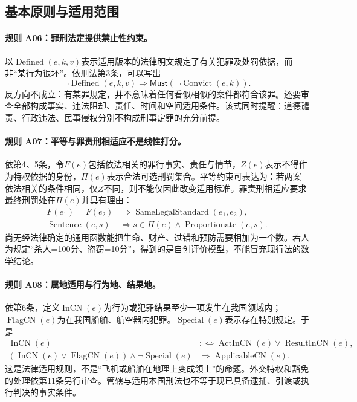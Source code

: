\subsection{基本原则与适用范围}
\paragraph{规则 A06：罪刑法定提供禁止性约束。}
以$\operatorname{Defined}(e,k,v)$表示适用版本的法律明文规定了有关犯罪及处罚依据，而非“某行为很坏”。依刑法第3条，可以写出
\[
\neg\operatorname{Defined}(e,k,v)
\Longrightarrow\mathsf{Must}(\neg\operatorname{Convict}(e,k)).
\]
反方向不成立：有某罪规定，并不意味着任何看似相似的案件都符合该罪。还要审查全部构成事实、违法阻却、责任、时间和空间适用条件。该式同时提醒：道德谴责、行政违法、民事侵权分别不构成刑事定罪的充分前提。

\paragraph{规则 A07：平等与罪责刑相适应不是线性打分。}
依第4、5条，令$F(e)$包括依法相关的罪行事实、责任与情节，$Z(e)$表示不得作为特权依据的身份，$\Pi(e)$表示合法可选刑罚集合。平等约束可表达为：若两案依法相关的条件相同，仅$Z$不同，则不能仅因此改变适用标准。罪责刑相适应要求最终刑罚处在$\Pi(e)$并具有理由：
\[
\begin{aligned}
F(e_1)=F(e_2)&\Longrightarrow
\operatorname{SameLegalStandard}(e_1,e_2),\\
\operatorname{Sentence}(e,s)&\Longrightarrow
s\in\Pi(e)\land\operatorname{Proportionate}(e,s).
\end{aligned}
\]
尚无经法律确定的通用函数能把生命、财产、过错和预防需要相加为一个数。若人为规定“杀人=100分、盗窃=10分”，得到的是自创评价模型，不能冒充现行法的数学结论。

\paragraph{规则 A08：属地适用与行为地、结果地。}
依第6条，定义$\operatorname{InCN}(e)$为行为或犯罪结果至少一项发生在我国领域内；$\operatorname{FlagCN}(e)$为在我国船舶、航空器内犯罪。$\operatorname{Special}(e)$表示存在特别规定。于是
\[
\begin{aligned}
\operatorname{InCN}(e)&:\!\iff
\operatorname{ActInCN}(e)\lor\operatorname{ResultInCN}(e),\\
(\operatorname{InCN}(e)\lor\operatorname{FlagCN}(e))
\land\neg\operatorname{Special}(e)
&\Longrightarrow\operatorname{ApplicableCN}(e).
\end{aligned}
\]
这是法律适用规则，不是“飞机或船舶在地理上变成领土”的命题。外交特权和豁免的处理依第11条另行审查。管辖与适用本国刑法也不等于现已具备逮捕、引渡或执行判决的事实条件。

